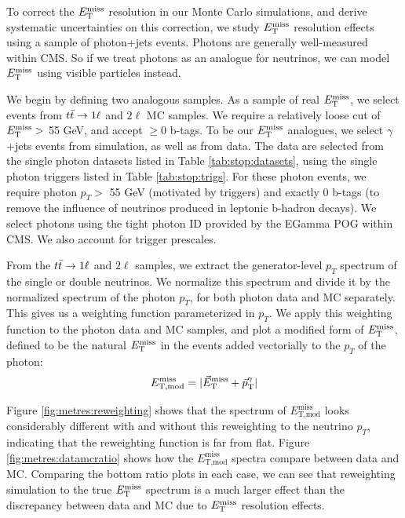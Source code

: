 To correct the $E_\text{T}^\text{miss}$ resolution in our Monte Carlo simulations, and
derive systematic uncertainties on this correction, we study $E_\text{T}^\text{miss}$
resolution effects using a sample of photon+jets events. Photons are
generally well-measured within CMS. So if we treat photons as an
analogue for neutrinos, we can model $E_\text{T}^\text{miss}$ using visible particles
instead.

We begin by defining two analogous samples. As a sample of real
$E_\text{T}^\text{miss}$, we select events from $t\bar{t} \rightarrow 1\ell$ and $2\ell$ MC samples. We
require a relatively loose cut of $E_\text{T}^\text{miss} >$ 55 GeV, and accept $\geq$0
b-tags. To be our $E_\text{T}^\text{miss}$ analogues, we select $\gamma$+jets events
from simulation, as well as from data. The data are selected
from the single photon datasets listed in Table
\ref{tab:stop:datasets}, using the single photon triggers listed in
Table \ref{tab:stop:trigs}. For these photon events, we require photon $p_T
>$ 55 GeV (motivated by triggers) and exactly 0 b-tags (to remove the
influence of neutrinos produced in leptonic b-hadron decays). We
select photons using the tight photon ID provided by the EGamma POG
within CMS. We also account for trigger prescales.

From the $t\bar{t} \rightarrow 1\ell$ and $2\ell$ samples, we extract the
generator-level $p_T$ spectrum of the single or double neutrinos. We
normalize this spectrum and divide it by the normalized spectrum of
the photon $p_T$, for both photon data and MC separately. This gives
us a weighting function parameterized in $p_T$. We apply this
weighting function to the photon data and MC samples, and plot
a modified form of $E_\text{T}^\text{miss}$, defined to be the natural $E_\text{T}^\text{miss}$ in the
events added vectorially to the $p_T$ of the photon:
\begin{equation}
E_\text{T,mod}^\text{miss} = |\vec{E}_\text{T}^\text{miss} + \vec{p}_\text{T}^\gamma|
\end{equation}

Figure \ref{fig:metres:reweighting} shows that the spectrum of
$E_\text{T,mod}^\text{miss}$ looks considerably different with and
without this reweighting to the neutrino $p_T$, indicating that the
reweighting function is far from flat. Figure
\ref{fig:metres:datamcratio} shows how the $E_\text{T,mod}^\text{miss}$
spectra compare between data and MC. Comparing the bottom ratio plots in each
case, we can see that reweighting simulation to the true $E_\text{T}^\text{miss}$
spectrum is a much larger effect than the discrepancy between data and
MC due to $E_\text{T}^\text{miss}$ resolution effects.


